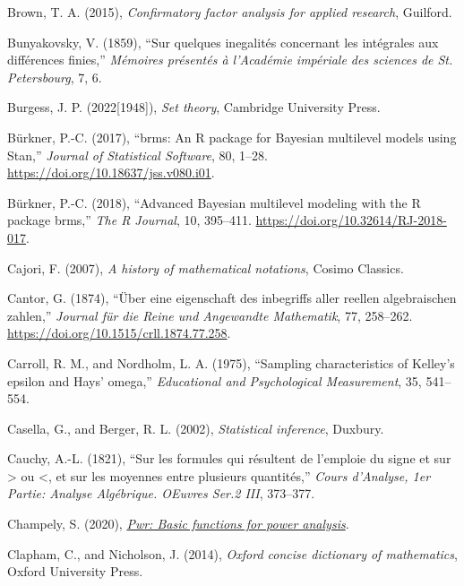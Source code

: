 \documentclass[
  10pt,
  a4paper,
  twoside]{article}
\newlength{\cslhangindent}
\newenvironment{CSLReferences}[2] %
 {\begin{list}{}{%
  \setlength{\itemindent}{0pt}
  \setlength{\leftmargin}{0pt}
  \setlength{\parsep}{0pt}
  \ifodd #1
   \setlength{\leftmargin}{\cslhangindent}
   \setlength{\itemindent}{-1\cslhangindent}
  \fi
  \setlength{\itemsep}{#2\baselineskip}}}
 {\end{list}}
\begin{document}
\begin{CSLReferences}{1}{0}
Brown, T. A. (2015), \emph{Confirmatory factor analysis for applied research}, Guilford.

Bunyakovsky, V. (1859), {``Sur quelques inegalités concernant les intégrales aux différences finies,''} \emph{Mémoires présentés à l'Académie impériale des sciences de St. Petersbourg}, 7, 6.

Burgess, J. P. (2022{[}1948{]}), \emph{Set theory}, Cambridge University Press.

Bürkner, P.-C. (2017), {``{brms}: An {R} package for {Bayesian} multilevel models using {Stan},''} \emph{Journal of Statistical Software}, 80, 1--28. \url{https://doi.org/10.18637/jss.v080.i01}.

Bürkner, P.-C. (2018), {``Advanced {Bayesian} multilevel modeling with the {R} package {brms},''} \emph{The R Journal}, 10, 395--411. \url{https://doi.org/10.32614/RJ-2018-017}.

Cajori, F. (2007), \emph{A history of mathematical notations}, Cosimo Classics.

Cantor, G. (1874), {``Über eine eigenschaft des inbegriffs aller reellen algebraischen zahlen,''} \emph{Journal für die Reine und Angewandte Mathematik}, 77, 258--262. \url{https://doi.org/10.1515/crll.1874.77.258}.

Carroll, R. M., and Nordholm, L. A. (1975), {``Sampling characteristics of {Kelley's epsilon} and {Hays' omega},''} \emph{Educational and Psychological Measurement}, 35, 541--554.

Casella, G., and Berger, R. L. (2002), \emph{Statistical inference}, Duxbury.

Cauchy, A.-L. (1821), {``Sur les formules qui résultent de l'emploie du signe et sur \textgreater{} ou \textless, et sur les moyennes entre plusieurs quantités,''} \emph{Cours d'Analyse, 1er Partie: Analyse Algébrique. OEuvres Ser.2 III}, 373--377.

Champely, S. (2020), \emph{\href{https://CRAN.R-project.org/package=pwr}{Pwr: Basic functions for power analysis}}.

Clapham, C., and Nicholson, J. (2014), \emph{Oxford concise dictionary of mathematics}, Oxford University Press.


\end{CSLReferences}
\end{document}
